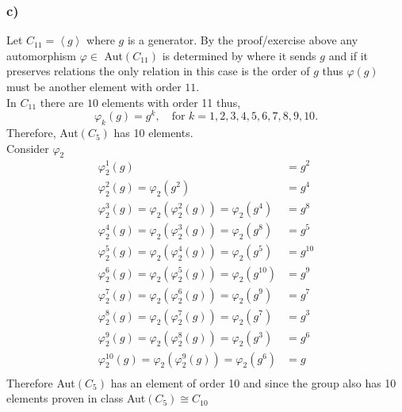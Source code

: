 \documentclass[12pt, letterpaper]{article}
\theoremstyle{definition}
\newcommand{\ang}[1]{\left\langle #1 \right\rangle}
\begin{document}
\subsubsection*{c)}
Let $C_{11}=\ang{g}$ where $g$ is a generator. By the proof/exercise above any automorphism $\varphi \in $ Aut$(C_{11})$ is determined by where it sends $g$ and if it preserves relations the only relation in this case is the order of $g$ thus $\varphi(g)$ must be another element with order $11$.\\
In $C_{11}$ there are $10$ elements with order 11 thus,\\
\[
\varphi_k(g)=g^k, \quad \text{for $k = 1,2,3,4,5,6,7,8,9,10$.}
\]
Therefore, Aut$(C_5)$ has 10 elements.\\
Consider $\varphi_2$
\begin{align*}
    \varphi_2^1(g)&=g^2\\
    \varphi_2^2(g)=\varphi_2(g^2)&=g^4\\
    \varphi_2^3(g)=\varphi_2(\varphi_2^2(g))=\varphi_2(g^4)&=g^8\\
    \varphi_2^4(g)=\varphi_2(\varphi_2^3(g))=\varphi_2(g^8)&=g^5\\
    \varphi_2^5(g)=\varphi_2(\varphi_2^4(g))=\varphi_2(g^5)&=g^{10}\\
    \varphi_2^6(g)=\varphi_2(\varphi_2^5(g))=\varphi_2(g^{10})&=g^9\\
    \varphi_2^7(g)=\varphi_2(\varphi_2^6(g))=\varphi_2(g^9)&=g^7\\
    \varphi_2^8(g)=\varphi_2(\varphi_2^7(g))=\varphi_2(g^7)&=g^3\\
    \varphi_2^9(g)=\varphi_2(\varphi_2^8(g))=\varphi_2(g^3)&=g^6\\
    \varphi_2^10(g)=\varphi_2(\varphi_2^9(g))=\varphi_2(g^6)&=g\\
\end{align*}
Therefore Aut$(C_5)$ has an element of order 10 and since the group also has 10 elements proven in class Aut$(C_5) \cong C_{10}$
\end{document}
